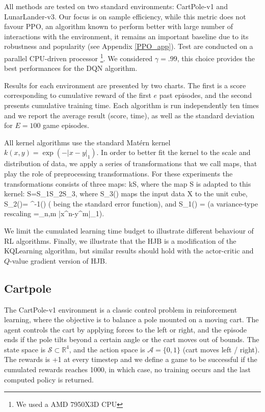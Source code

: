 \documentclass[
]{article}
\def\({}%
\def\){}%
\numberwithin{equation}{section}
\begin{document}
All methods are tested on two standard environments: CartPole-v1 and LunarLander-v3. Our focus
is on sample efficiency, while this metric does not favour PPO, an algorithm known to perform
better with large number of interactions with the environment, it remains an important baseline
due to its robustness and popularity (see Appendix \ref{PPO_app}). Test are conducted on a parallel CPU-driven processor \footnote{We used a AMD 7950X3D CPU}. We considered $\gamma= .99$, this choice provides the best performances for the DQN algorithm. 

Results for each environment are presented by two charts. The first is a score corresponding to cumulative reward of the first $e$ past episodes, and the second presents cumulative training time. Each algorithm is run independently ten times and we report the average result (score, time), as well as the standard deviation for $E=100$ game episodes.

All kernel algorithms use the standard Matérn kernel
$k(x,y) = \exp(-|x-y|_1)$. In order to better fit the kernel to the scale and distribution of data, we apply a series of transformations that we call maps, that play the role of preprocessing transformations. For these experiments the transformations consists of three maps:  
\(k\circ S\), where the map \(S\) is adapted to this kernel:
\(S=S_1\circ S_2\circ S_3\), where \(S_3(\cdot)\) maps the input data
\(X\) to the unit cube, \(S_2(\cdot)= ^{-1}(\cdot)\)
(\(\) being the standard error function), and
\(S_1(\cdot) = \frac{\cdot}{\alpha}\) (a variance-type rescaling
\(\alpha=\sum_{n,m} |x^n-y^m|_1\)).

We limit the cumulated learning time budget to illustrate different behaviour of RL algorithms. Finally, we illustrate that the HJB is a modification of the KQLearning algorithm, but similar results should hold with the actor-critic and $Q$-value gradient version of HJB.


\hypertarget{Cartpole}{%
\subsection{Cartpole}\label{Cartpole}}
The CartPole-v1 environment is a classic control problem in reinforcement learning, where the objective is to balance a pole mounted on a moving cart. The agent controls the cart by applying forces to the left or right, and the episode ends if the pole tilts beyond a certain angle or the cart moves out of bounds. The state space is $\mathcal{S} \subset \mathbb{R}^4$, and the action space is $\mathcal{A} = \{0,1\}$ (cart moves left / right). The rewards is +1 at every timestep and we define a game to be successful if the cumulated rewards reaches 1000, in which case, no training occurs and the last computed policy is returned.
\end{document}

